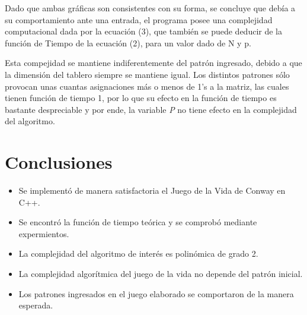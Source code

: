 \documentclass[12pt,letterpaper]{article}
\begin{document}
Dado que ambas gráficas son consistentes con su forma, se concluye que debía a su comportamiento ante una entrada, el programa posee una complejidad computacional dada por la ecuación (3), que también se puede deducir de la función de Tiempo de la ecuación (2), para un valor dado de N y p.


Esta compejidad se mantiene indiferentemente del patrón ingresado, debido a que la dimensión del tablero siempre se mantiene igual. Los distintos patrones sólo provocan unas cuantas asignaciones más o menos de 1's a la matriz, las cuales tienen función de tiempo 1, por lo que su efecto en la función de tiempo es bastante despreciable y por ende, la variable \textit{P} no tiene efecto en la complejidad del algoritmo.

\newpage 
\section{Conclusiones}
\begin{itemize}
\item Se implementó de manera satisfactoria el Juego de la Vida de Conway en C++.
\item Se encontró la función de tiempo teórica y se comprobó mediante expermientos.
\item La complejidad del algoritmo de interés es polinómica de grado 2.
\item La complejidad algorítmica del juego de la vida no depende del patrón inicial.
\item Los patrones ingresados en el juego elaborado se comportaron de la manera esperada.
\end{itemize}
\end{document}
